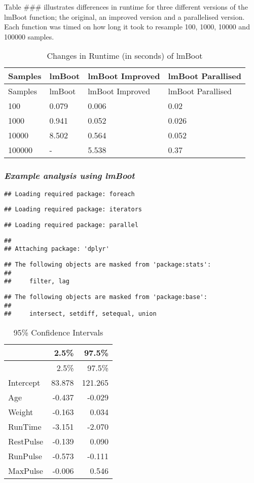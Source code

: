 \documentclass[]{article}
\begin{document}
Table \#\#\# illustrates differences in runtime for three different
versions of the lmBoot function; the original, an improved version and a
parallelised version. Each function was timed on how long it took to
resample 100, 1000, 10000 and 100000 samples.

\begin{longtable}[]{@{}llll@{}}
\caption{Changes in Runtime (in seconds) of lmBoot}\tabularnewline
\toprule
Samples & lmBoot & lmBoot Improved & lmBoot Parallised\tabularnewline
\midrule
\endfirsthead
\toprule
Samples & lmBoot & lmBoot Improved & lmBoot Parallised\tabularnewline
\midrule
\endhead
100 & 0.079 & 0.006 & 0.02\tabularnewline
1000 & 0.941 & 0.052 & 0.026\tabularnewline
10000 & 8.502 & 0.564 & 0.052\tabularnewline
100000 & - & 5.538 & 0.37\tabularnewline
\bottomrule
\end{longtable}

\subsubsection{\texorpdfstring{\emph{Example analysis using
lmBoot}}{Example analysis using lmBoot}}\label{example-analysis-using-lmboot}

\begin{verbatim}
## Loading required package: foreach
\end{verbatim}

\begin{verbatim}
## Loading required package: iterators
\end{verbatim}

\begin{verbatim}
## Loading required package: parallel
\end{verbatim}

\begin{verbatim}
## 
## Attaching package: 'dplyr'
\end{verbatim}

\begin{verbatim}
## The following objects are masked from 'package:stats':
## 
##     filter, lag
\end{verbatim}

\begin{verbatim}
## The following objects are masked from 'package:base':
## 
##     intersect, setdiff, setequal, union
\end{verbatim}

\begin{longtable}[]{@{}lrr@{}}
\caption{95\% Confidence Intervals}\tabularnewline
\toprule
& 2.5\% & 97.5\%\tabularnewline
\midrule
\endfirsthead
\toprule
& 2.5\% & 97.5\%\tabularnewline
\midrule
\endhead
Intercept & 83.878 & 121.265\tabularnewline
Age & -0.437 & -0.029\tabularnewline
Weight & -0.163 & 0.034\tabularnewline
RunTime & -3.151 & -2.070\tabularnewline
RestPulse & -0.139 & 0.090\tabularnewline
RunPulse & -0.573 & -0.111\tabularnewline
MaxPulse & -0.006 & 0.546\tabularnewline
\bottomrule
\end{longtable}
\end{document}
